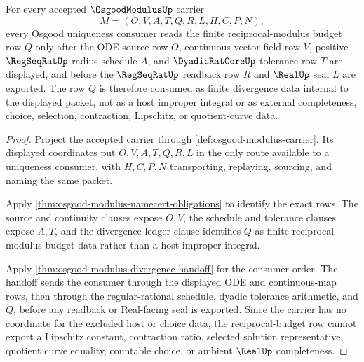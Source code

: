 \begin{theorem}
\label{thm:osgood-modulus-integral-divergence-row}
For every accepted $\OsgoodModulusUp$ carrier
$$
M=(O,V,A,T,Q,R,L,H,C,P,N),
$$
every Osgood uniqueness consumer reads the finite reciprocal-modulus budget row $Q$ only after the ODE source row $O$, continuous vector-field row $V$, positive $\RegSeqRatUp$ radius schedule $A$, and $\DyadicRatCoreUp$ tolerance row $T$ are displayed, and before the $\RegSeqRatUp$ readback row $R$ and $\RealUp$ seal $L$ are exported. The row $Q$ is therefore consumed as finite divergence data internal to the displayed packet, not as a host improper integral or as external completeness, choice, selection, contraction, Lipschitz, or quotient-curve data.
\end{theorem}
\begin{proof}
Project the accepted carrier through \autoref{def:osgood-modulus-carrier}. Its displayed coordinates put $O,V,A,T,Q,R,L$ in the only route available to a uniqueness consumer, with $H,C,P,N$ transporting, replaying, sourcing, and naming the same packet.

Apply \autoref{thm:osgood-modulus-namecert-obligations} to identify the exact rows. The source and continuity clauses expose $O,V$, the schedule and tolerance clauses expose $A,T$, and the divergence-ledger clause identifies $Q$ as finite reciprocal-modulus budget data rather than a host improper integral.

Apply \autoref{thm:osgood-modulus-divergence-handoff} for the consumer order. The handoff sends the consumer through the displayed ODE and continuous-map rows, then through the regular-rational schedule, dyadic tolerance arithmetic, and $Q$, before any readback or Real-facing seal is exported. Since the carrier has no coordinate for the excluded host or choice data, the reciprocal-budget row cannot export a Lipschitz constant, contraction ratio, selected solution representative, quotient curve equality, countable choice, or ambient $\RealUp$ completeness.
\end{proof}


